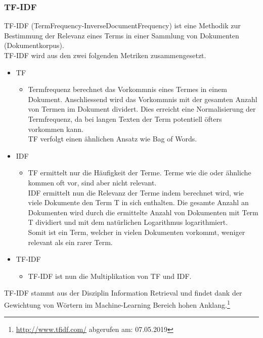 \subsubsection{TF-IDF}
TF-IDF (TermFrequency-InverseDocumentFrequency) ist eine Methodik zur Bestimmung der Relevanz eines Terms in einer Sammlung von Dokumenten (Dokumentkorpus).\\
TF-IDF wird aus den zwei folgenden Metriken zusammengesetzt.
\begin{itemize}
	\item TF
	\begin{itemize}
		\item Termfrequenz berechnet das Vorkommnis eines Termes in einem Dokument. Anschliessend wird das Vorkommnis mit der gesamten Anzahl von Termen im Dokument dividert. Dies erreicht eine Normalisierung der Termfrequenz, da bei langen Texten der Term potentiell öfters vorkommen kann.\\
		TF verfolgt einen ähnlichen Ansatz wie Bag of Words.
	\end{itemize}
	\item IDF
	\begin{itemize}
		\item TF ermittelt nur die Häufigkeit der Terme. Terme wie \glqq die\grqq{} oder ähnliche kommen oft vor, sind aber nicht relevant.\\
		IDF ermittelt nun die Relevanz der Terme indem berechnet wird, wie viele Dokumente den Term T in sich enthalten. Die gesamte Anzahl an Dokumenten wird durch die ermittelte Anzahl von Dokumenten mit Term T dividiert und mit dem natürlichen Logarithmus logarithmiert.\\
		Somit ist ein Term, welcher in vielen Dokumenten vorkommt, weniger relevant als ein rarer Term.
	\end{itemize}
	\item TF-IDF
	\begin{itemize}
		\item TF-IDF ist nun die Multiplikation von TF und IDF.
	\end{itemize}
\end{itemize}
TF-IDF stammt aus der Disziplin \glqq Information Retrieval\grqq{} und findet dank der Gewichtung von Wörtern im Machine-Learning Bereich hohen Anklang.\footnote{\url{http://www.tfidf.com/} abgerufen am: 07.05.2019}
